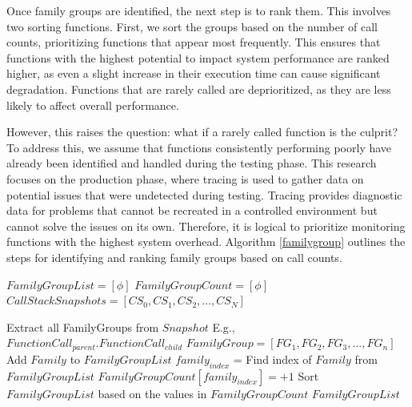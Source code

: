 \documentclass[pdflatex,sn-nature]{sn-jnl}%
\theoremstyle{thmstyleone}%
\theoremstyle{thmstyletwo}%
\theoremstyle{thmstylethree}%
\begin{document}
Once family groups are identified, the next step is to rank them. This involves two sorting functions. First, we sort the groups based on the number of call counts, prioritizing functions that appear most frequently. This ensures that functions with the highest potential to impact system performance are ranked higher, as even a slight increase in their execution time can cause significant degradation. Functions that are rarely called are deprioritized, as they are less likely to affect overall performance.

However, this raises the question: what if a rarely called function is the culprit? To address this, we assume that functions consistently performing poorly have already been identified and handled during the testing phase. This research focuses on the production phase, where tracing is used to gather data on potential issues that were undetected during testing. Tracing provides diagnostic data for problems that cannot be recreated in a controlled environment but cannot solve the issues on its own. Therefore, it is logical to prioritize monitoring functions with the highest system overhead. Algorithm \ref{familygroup} outlines the steps for identifying and ranking family groups based on call counts.

\begin{algorithm}[tbp]

  \caption{Family-group Identification \& Sorting}\label{familygroup}

  \begin{algorithmic}[1]
    \State $FamilyGroupList=[\phi]$
    \State $FamilyGroupCount=[\phi]$
    \State $CallStackSnapshots=[CS_0,CS_1,CS_2,...,CS_N]$

        \State Extract all FamilyGroups from $Snapshot$
        \State E.g., $FunctionCall_{parent}.FunctionCall_{child}$
        \State $FamilyGroup = [FG_1,FG_2,FG_3,...,FG_n]$
                \State Add $Family$ to $FamilyGroupList$
            \Else
                \State $family_{index}$ = Find index of $Family$ from $FamilyGroupList$
                \State $FamilyGroupCount[family_{index}] =+ 1$
            \EndIf
        \EndFor
    \EndFor
    \State Sort $FamilyGroupList$ based on the values in $FamilyGroupCount$
    \State \Return $FamilyGroupList$
  
  \end{algorithmic}
\end{algorithm}
\end{document}
